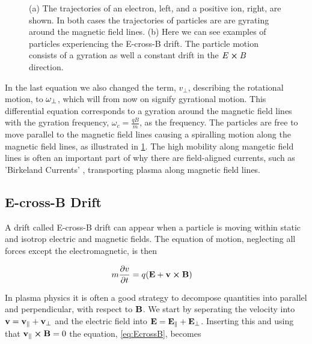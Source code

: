 		\begin{figure}
			\centering
			\begin{subfigure}{0.45\textwidth}
				
				\caption{
				  }
				\label{fig:gyration}
			\end{subfigure}
			\begin{subfigure}{0.45\textwidth}
				
				\caption{}
				\label{fig:EcrossB}
			\end{subfigure}
			\caption{(a) The trajectories of an electron, left, and a positive ion, right, are shown.
				In both cases the trajectories of particles are are gyrating around the magnetic field lines.
				(b) Here we can see examples of particles experiencing the E-cross-B drift. The particle motion consists of a gyration
				as well a constant drift in the \(E\cross B\) direction.}
		\end{figure}

		In the last equation we also changed the term, \(v_\perp\), describing the rotational motion,
		to \(\vb{\omega}_\perp\), which will from now on signify gyrational motion.
		This differential equation corresponds to a gyration around the magnetic field lines
		with the gyration frequency, \(\omega_c = \frac{qB}{m}\), as the frequency. The particles are free to
		move parallel to the magnetic field lines causing a spiralling motion along the magnetic field lines, as illustrated in
		\cref{fig:gyration}. The high mobility along mangetic field lines is often an important part of why
		there are field-aligned currents, such as 'Birkeland Currents' \citep{cummings_field-aligned_1967},
		transporting plasma along magnetic field lines.

	\subsection{E-cross-B Drift}
	A drift called E-cross-B drift can appear when a particle is moving within static and isotrop
	electric and magnetic fields. The equation of motion, neglecting all forces
	except the electromagnetic, is then

	\begin{align}
		m\pdv{v}{t} &= q(\vb{E} + \vb{v}\cross\vb{B}) \label{eq:EcrossB}
	\end{align}

	In plasma physics it is often a good strategy to decompose quantities into
	parallel and perpendicular, with respect to \(\vb{B}\). We start by seperating the
	velocity into \(\vb{v} = \vb{v}_\parallel + \vb{v}_\perp\) and the electric field
	into \(\vb{E} = \vb{E}_\parallel + \vb{E}_\perp\). Inserting this and using that \(\vb{v}_\parallel\cross\vb{B}=0\)
	the equation, \cref{eq:EcrossB}, becomes

